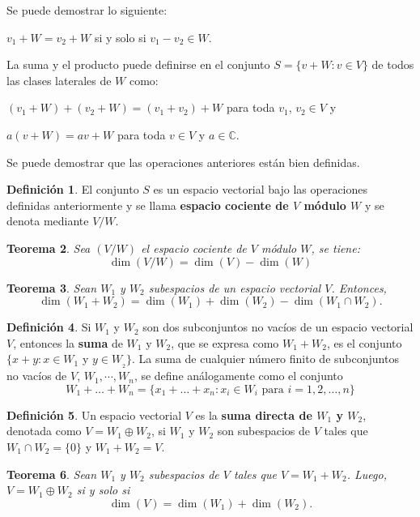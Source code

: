 \documentclass[12pt]{book}
\newtheorem{theorem}{Teorema}[section]
\theoremstyle{definition}
\newtheorem{definition}[theorem]{Definición}
\newcounter{in}
\newcounter{ini}
\begin{document}
Se puede demostrar lo siguiente:
 
$v_{1}+W=v_{2}+W$ si y solo si $v_{1}-v_{2}\in W.$

La suma y el producto puede definirse en el conjunto $S=\{v+W:v\in
V\}$ de todos las clases laterales de $W$ como: 

$(v_{1}+W)+(v_{2}+W)=(v_{1}+v_{2})+W$ para toda $v_{1}$, $v_{2}\in V$ y

$a(v+W)=av+W$ para toda $v\in V$ y $a\in \mathbb{C}$.

Se puede demostrar que las operaciones anteriores están bien definidas.

\begin{definition}
  El conjunto $S$ es un espacio vectorial bajo las operaciones
  definidas anteriormente y se llama \textbf{espacio cociente de $V$ módulo $W$} y se denota mediante $V/W$. 
\end{definition}

\begin{theorem}
  \label{dim-esp-coc}
  Sea $(V/W)$ el espacio cociente de $V$ módulo $W$, se tiene:
  $$\dim(V/W)=\dim(V)-\dim(W)$$
\end{theorem}

\begin{theorem}
  \label{dim-esp-vec}
  Sean $W_{1}$ y $W_{2}$ subespacios de un espacio vectorial
  $V$. Entonces, 
  $$\dim(W_{1}+W_{2})=\dim(W_{1})+\dim(W_{2})-\dim(W_{1}\cap W_{2}).$$ 
\end{theorem}

\begin{definition}
  Si $W_{1}$ y $W_{2}$ son dos subconjuntos no vacíos de un espacio
  vectorial $V$, entonces la \textbf{suma} de $W_{1}$ y $W_{2}$, que se
  expresa como $W_{1}+W_{2}$, es el conjunto $\{x+y:x\in W_{1}$ y $y\in
  W_{_2}\}$. La suma de cualquier número finito de subconjuntos no
  vacíos de $V$, $W_{1},\cdots,W_{n}$, se define análogamente como el
  conjunto
  $$W_{1}+\ldots+W_{n}=\{x_{1}+\ldots+x_{n}: x_{i}\in W_{i} \mbox{ para }i=1,2,\ldots,n\}$$
\end{definition}

\begin{definition}
  Un espacio vectorial $V$ es la \textbf{suma directa de $W_{1}$ y
  $W_{2}$}, denotada como $V=W_{1}\oplus W_{2}$, si $W_{1}$ y $W_{2}$
son subespacios de $V$ tales que $W_{1}\cap W_{2}=\{0\}$ y $W_{1}+W_{2}=V.$ 
\end{definition}

\begin{theorem}
  Sean $W_{1}$ y $W_{2}$ subespacios de $V$ tales que
  $V=W_{1}+W_{2}$. Luego, $V=W_{1}\oplus W_{2}$ si y solo si 
  $$\dim(V)=\dim(W_{1})+\dim(W_{2}).$$
\end{theorem}
\end{document}
